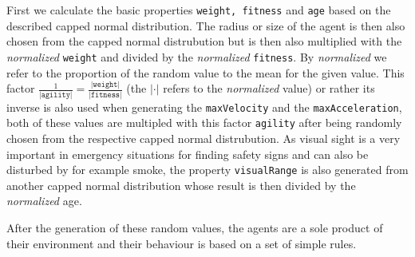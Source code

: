 \documentclass[11pt]{article}
\begin{document}
First we calculate the basic properties \texttt{weight, fitness} and \texttt{age} based on the described capped normal distribution. The radius or size of the agent is then also chosen from the capped normal distrubution but is then also multiplied with the \textit{normalized} \texttt{weight} and divided by the \textit{normalized} \texttt{fitness}. By \textit{normalized} we refer to the proportion of the random value to the mean for the given value. This factor $\frac{1}{\texttt{|agility|}} = \frac{\texttt{|weight|}}{\texttt{|fitness|}}$ (the $|\cdot|$ refers to the \textit{normalized} value) or rather its inverse is also used when generating the \texttt{maxVelocity} and the \texttt{maxAcceleration}, both of these values are multipled with this factor \texttt{agility} after being randomly chosen from the respective capped normal distrubution. As visual sight is a very important in emergency situations for finding safety signs and can also be disturbed by for example smoke, the property \texttt{visualRange} is also generated from another capped normal distribution whose result is then divided by the \textit{normalized} age.

After the generation of these random values, the agents are a sole product of their environment and their behaviour is based on a set of simple rules.
\end{document}

